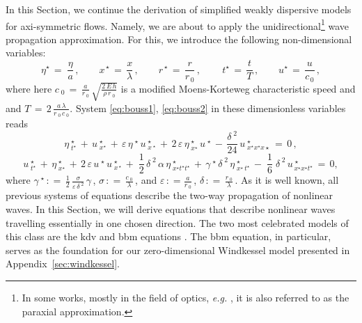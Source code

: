 \documentclass[alpha-refs, 12pt]{wiley-article}
\newcommand{\eps}{\varepsilon}
\newcommand{\eqdef}{\mathrel{\mathop:}=}
\begin{document}
In this Section, we continue the derivation of simplified weakly dispersive models for axi-symmetric flows. Namely, we are about to apply the unidirectional\footnote{In some works, mostly in the field of optics, \emph{e.g.} \cite{Agrawal1979}, it is also referred to as the paraxial approximation.} wave propagation approximation. For this, we introduce the following non-dimensional variables:
\begin{equation*}
   \eta^{\star}\,=\;\frac{\eta}{a}\,, \qquad x^{\,\star}\,=\,\frac{x}{\lambda}\,, \qquad r^{\,\star}\,=\,\frac{r}{r_{\,0}}\,,\,\qquad t^{\star}\,=\,\frac{t}{T}\,,\qquad u^{\star}\,=\,\frac{u}{c_{\,0}}\,,
\end{equation*}
where here $c_{\;0}\,=\,\displaystyle\frac{a}{r_{\;0}}\,\sqrt{\frac{2\,E\,h}{ \rho\,r_{\;0}}}$ is a modified Moens-Korteweg characteristic speed and and $T\,=\,2\,\displaystyle\frac{a\,\lambda}{r_{\;0}\,c_{\;0}}$. System \eqref{eq:bouss1}, \eqref{eq:bouss2} in these dimensionless variables reads
\begin{equation}\label{eq:bouss1d}
  \eta^{\;\star}_{\;t^{\star}}\,+\,u^{\;\star}_{\;x^{\star}} \,+\, \eps\,\eta^{\;\star}\,u^{\;\star}_{\;x^{\;\star}}\,+\,2\,\eps\,\eta^{\;\star}_{\;x^{\star}}\,u^{\;\star}\,-\,\frac{\delta^{\;2}}{24}\,u^{\;\star}_{\;x^{\star}x^{ \star}x{\star}}\,=\,0\,,
\end{equation}
\begin{equation}\label{eq:bouss2d}
  u^{\;\star}_{\;t^{\star}}\, + \,\eta^{\;\star}_{\;x^{\star}}\, + \,2\,\eps\,u^{\;\star}\,u^{\;\star}_{\;x^{\,\star}}\, + \;\frac{1}{2}\,\delta^{\;2}\,\alpha\,\eta^{\;\star}_{\;x^{\star}t^{\star}t^{\star}}\, + \,\gamma^{\;\star}\,\delta^{\;2}\,\eta^{\;\star}_{\;x^{\star}\,t^{\star}}\, - \;\frac{1}{6}\;\delta^{\;2}\,u^{\;\star}_{\,x^{\star}x^{\star}t^{\star}}\,=\,0,
\end{equation}
where $\gamma^{\;\star}\,\eqdef\,\displaystyle\frac{1}{2}\,\frac{\sigma}{\eps\,\delta^{\;2}}\,\gamma\,$, $\sigma\,\eqdef\,\frac{c_{\;0}}{\lambda}\,$,  and $\eps\,\eqdef\frac{a}{r_{\;0}}\,$, $\delta\,\eqdef\,\frac{r_{\;0}}{\lambda}\,$. As it is well known, all previous systems of equations describe the two-way propagation of nonlinear waves. In this Section, we will derive equations that describe nonlinear waves travelling essentially in one chosen direction. The two most celebrated models of this class are the \acrshort{kdv} and \acrshort{bbm} equations \cite{KdV, bona, Bona1975a, Zabusky1971, Dutykh2013a, Dutykh2014d, Dutykh2014a}. The \acrshort{bbm} equation, in particular, serves as the foundation for our zero-dimensional Windkessel model presented in Appendix~\ref{sec:windkessel}.
\end{document}
